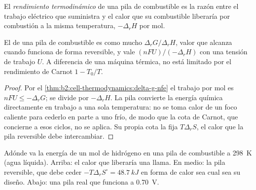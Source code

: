 \begin{definition}\label{def:b2:cell-thermodynamics:efficiency}
El \emph{rendimiento termodinámico} de una pila de
combustible es la razón entre el trabajo eléctrico que suministra y el calor que su combustible
liberaría por combustión a la misma temperatura, $-\Delta_r H$ por mol.
\end{definition}

\begin{proposition}\label{prop:b2:cell-thermodynamics:efficiency}
El  de una pila de combustible es como mucho $\Delta_r G/\Delta_r H$,
valor que alcanza cuando funciona de forma reversible, y vale $(nFU)/(-\Delta_r H)$ con una
tensión de trabajo $U$. A diferencia de una máquina térmica, no está limitado por el rendimiento de Carnot
$1 - T_0/T$.
\end{proposition}

\begin{proof}
Por el \cref{thm:b2:cell-thermodynamics:delta-g-nfe} el trabajo por mol es $nFU \leq
-\Delta_r G$; se divide por $-\Delta_r H$. La pila convierte la energía química directamente
en trabajo a una sola temperatura: no se toma calor de un foco caliente para
cederlo en parte a uno frío, de modo que la cota de Carnot, que concierne a esos ciclos,
no se aplica. Su propia cota la fija $T\Delta_r S$, el calor que la pila reversible
debe intercambiar.
\end{proof}

\begin{omfigure}

{\small Adónde va la energía de un mol de hidrógeno en una pila de combustible a
\qty{298}{K} (agua líquida). Arriba: el calor que liberaría una llama. En medio: la
pila reversible, que debe ceder $-T\Delta_r S^\circ = \qty{48.7}{kJ}$ en forma de calor
sea cual sea su diseño. Abajo: una pila real que funciona a \qty{0.70}{V}.}
\end{omfigure}

